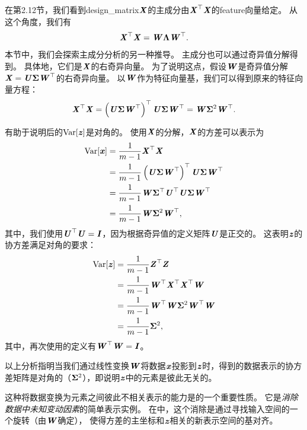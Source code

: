 在第2.12节，我们看到\gls{design_matrix}$\MX$的主成分由$\MX^\Tsp\MX$的\gls{feature}向量给定。
从这个角度，我们有
\begin{equation}
    \MX^\Tsp\MX = \MW \VLambda \MW^\Tsp .
\end{equation}
本节中，我们会探索主成分分析的另一种推导。
主成分也可以通过奇异值分解得到。
具体地，它们是$\MX$的右奇异向量。
为了说明这点，假设$\MW$是奇异值分解$\MX = \MU\VSigma\MW^\Tsp$的右奇异向量。
以$\MW$作为特征向量基，我们可以得到原来的特征向量方程：
\begin{equation}
    \MX^\Tsp\MX = \left( \MU\VSigma \MW^\Tsp \right)^\Tsp \MU\VSigma \MW^\Tsp = 
    \MW \VSigma^2 \MW^\Tsp .
\end{equation}


有助于说明后的$\text{Var}[\Vz]$是对角的。
使用$\MX$的分解，$\MX$的方差可以表示为
\begin{align}
    \text{Var}[\Vx] &= \frac{1}{m-1} \MX^\Tsp\MX \\
    &= \frac{1}{m-1} \left( \MU\VSigma \MW^\Tsp \right)^\Tsp \MU\VSigma \MW^\Tsp \\
    &= \frac{1}{m-1} \MW \VSigma^\Tsp \MU^\Tsp \MU\VSigma \MW^\Tsp \\
    &= \frac{1}{m-1} \MW \VSigma^2 \MW^\Tsp ,
\end{align}
其中，我们使用$\MU^\Tsp\MU = \MI$，因为根据奇异值的定义矩阵$\MU$是正交的。
这表明$\Vz$的协方差满足对角的要求：
\begin{align}
    \text{Var}[\Vz] &= \frac{1}{m-1} \MZ^\Tsp\MZ \\
    &= \frac{1}{m-1} \MW^\Tsp \MX^\Tsp \MX^\Tsp \MW \\
    &= \frac{1}{m-1} \MW^\Tsp\MW \VSigma^2 \MW^\Tsp\MW \\
    &= \frac{1}{m-1} \VSigma^2 ,
\end{align}
其中，再次使用的定义有$\MW^\Tsp\MW = \MI$。

以上分析指明当我们通过线性变换$\MW$将数据$\Vx$投影到$\Vz$时，得到的数据表示的协方差矩阵是对角的（$\VSigma^2$），即说明$\Vz$中的元素是彼此无关的。

这种将数据变换为元素之间彼此不相关表示的能力是的一个重要性质。
它是\emph{消除数据中未知变动因素}的简单表示实例。
在中，这个消除是通过寻找输入空间的一个旋转（由$\MW$确定），
使得方差的主坐标和$\Vz$相关的新表示空间的基对齐。



